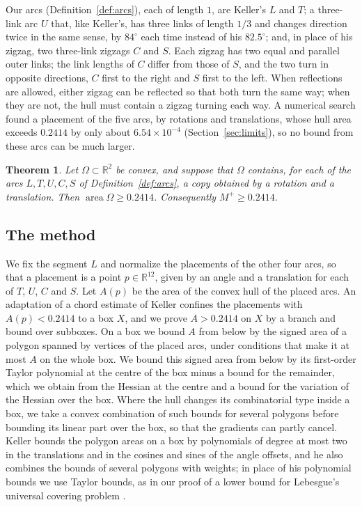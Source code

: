 \documentclass[11pt]{amsart}
\newtheorem{theorem}{Theorem}[section]
\theoremstyle{definition}
\theoremstyle{remark}
\numberwithin{equation}{section}
\newcommand{\R}{\mathbb{R}}
\newcommand{\area}{\operatorname{area}}
\newcommand{\Mp}{M^{+}}
\newcommand{\TAU}{0.2414}
\newcommand{\GAPFAM}{6.54\times10^{-4}}    %
\begin{document}
Our arcs (Definition~\ref{def:arcs}), each of length $1$, are Keller's $L$ and $T$; a three-link arc $U$ that, like Keller's, has three links of length $1/3$ and changes direction twice in the same sense, by $84^\circ$ each time instead of his $82.5^\circ$; and, in place of his zigzag, two three-link zigzags $C$ and $S$. Each zigzag has two equal and parallel outer links; the link lengths of $C$ differ from those of $S$, and the two turn in opposite directions, $C$ first to the right and $S$ first to the left. When reflections are allowed, either zigzag can be reflected so that both turn the same way; when they are not, the hull must contain a zigzag turning each way. A numerical search found a placement of the five arcs, by rotations and translations, whose hull area exceeds $\TAU$ by only about $\GAPFAM$ (Section~\ref{sec:limits}), so no bound from these arcs can be much larger.

\begin{theorem}\label{thm:main}
Let $\Omega\subset\R^2$ be convex, and suppose that $\Omega$ contains, for each of the arcs $L,T,U,C,S$ of Definition~\textup{\ref{def:arcs}}, a copy obtained by a rotation and a translation. Then $\area\Omega\ge\TAU$. Consequently $\Mp\ge\TAU$.
\end{theorem}

\subsection*{The method}
We fix the segment $L$ and normalize the placements of the other four arcs, so that a placement is a point $p\in\R^{12}$, given by an angle and a translation for each of $T$, $U$, $C$ and $S$. Let $A(p)$ be the area of the convex hull of the placed arcs. An adaptation of a chord estimate of Keller confines the placements with $A(p)<\TAU$ to a box $X$, and we prove $A>\TAU$ on $X$ by a branch and bound over subboxes. On a box we bound $A$ from below by the signed area of a polygon spanned by vertices of the placed arcs, under conditions that make it at most $A$ on the whole box. We bound this signed area from below by its first-order Taylor polynomial at the centre of the box minus a bound for the remainder, which we obtain from the Hessian at the centre and a bound for the variation of the Hessian over the box. Where the hull changes its combinatorial type inside a box, we take a convex combination of such bounds for several polygons before bounding its linear part over the box, so that the gradients can partly cancel. Keller \cite{Kel26} bounds the polygon areas on a box by polynomials of degree at most two in the translations and in the cosines and sines of the angle offsets, and he also combines the bounds of several polygons with weights; in place of his polynomial bounds we use Taylor bounds, as in our proof of a lower bound for Lebesgue's universal covering problem \cite{Tom26}.
\end{document}
